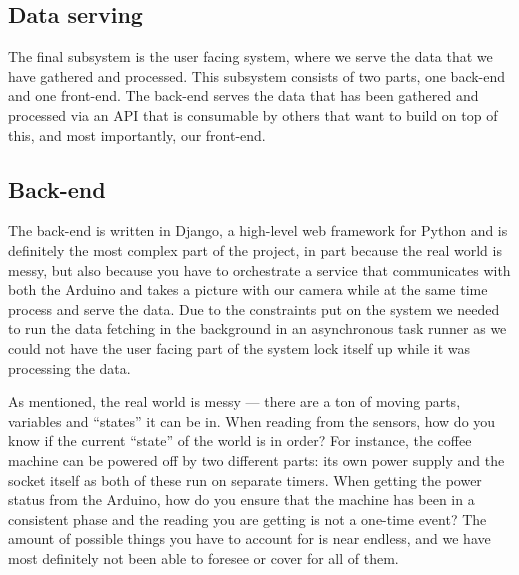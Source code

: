 \documentclass[12pt,a4paper,oneside,article]{memoir}
\numberwithin{equation}{chapter}
\begin{document}
\subsection{Data serving}\label{sec:data-serving}
The final subsystem is the user facing system, where we serve the data that we 
have gathered and processed. This subsystem consists of two parts, one back-end 
and one front-end. The back-end serves the data that has been gathered and 
processed via an API that is consumable by others that want to build on top of 
this, and most importantly, our front-end.

\subsection{Back-end}\label{sec:back-end}
The back-end is written in Django, a high-level web framework for Python and is
definitely the most complex part of the project, in part because the real world
is messy, but also because you have to orchestrate a service that communicates
with both the Arduino and takes a picture with our camera while at the same
time process and serve the data. Due to the constraints put on the system we
needed to run the data fetching in the background in an asynchronous task
runner as we could not have the user facing part of the system lock itself up
while it was processing the data.

As mentioned, the real world is messy --- there are a ton of moving parts,
variables and ``states'' it can be in. When reading from the sensors, how do you
know if the current ``state'' of the world is in order? For instance, the coffee
machine can be powered off by two different parts: its own power supply and the
socket itself as both of these run on separate timers. When getting the power
status from the Arduino, how do you ensure that the machine has been in a
consistent phase and the reading you are getting is not a one-time event? The
amount of possible things you have to account for is near endless, and we have
most definitely not been able to foresee or cover for all of them.
\end{document}
